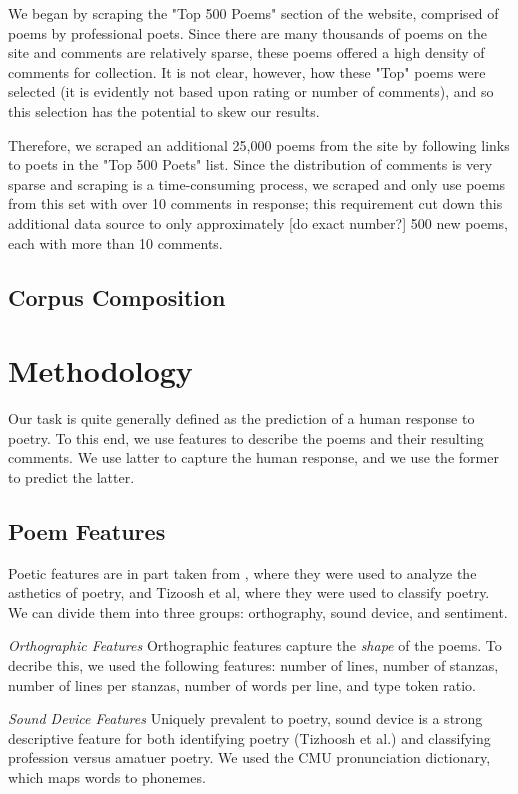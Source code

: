 \documentclass[11pt]{article}
\begin{document}
We began by scraping the "Top 500 Poems" section of the website, comprised of poems by professional poets. Since there are many thousands of poems on the site and comments are relatively sparse, these poems offered a high density of comments for collection. It is not clear, however, how these "Top" poems were selected (it is evidently not based upon rating or number of comments), and so this selection has the potential to skew our results.

Therefore, we scraped an additional 25,000 poems from the site by following links to poets in the "Top 500 Poets" list. Since the distribution of comments is very sparse and scraping is a time-consuming process, we scraped and only use poems from this set with over 10 comments in response; this requirement cut down this additional data source to only approximately [do exact number?] 500 new poems, each with more than 10 comments.

\subsection*{Corpus Composition}

\section{Methodology}
Our task is quite generally defined as the prediction of a human response to poetry. To this end, we use features to describe the poems and their resulting comments. We use latter to capture the human response, and we use the former to predict the latter.

\subsection*{Poem Features}
Poetic features are in part taken from , where they were used to analyze the asthetics of poetry, and Tizoosh et al, where they were used to classify poetry. We can divide them into three groups: orthography, sound device, and sentiment.

\emph{Orthographic Features}
Orthographic features capture the \emph{shape} of the poems. To decribe this, we used the following features: number of lines, number of stanzas, number of lines per stanzas, number of words per line, and type token ratio.

\emph{Sound Device Features}
Uniquely prevalent to poetry, sound device is a strong descriptive feature for both identifying poetry (Tizhoosh et al.) and classifying profession versus amatuer poetry. We used the CMU pronunciation dictionary, which maps words to phonemes.
\end{document}

